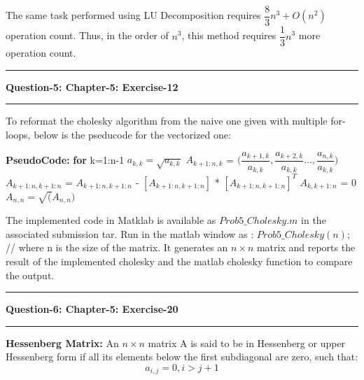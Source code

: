 \documentclass{article}
\newcommand\question[2]{\vspace{.25in}\hrule\textbf{#1: #2}\hrule\vspace{.10in}}
\newcommand\pseudoCode{\vspace{.10in}\textbf{PseudoCode: }}
\begin{document}
The same task performed using LU Decomposition requires $\dfrac{8}{3}n^3 + O(n^2)$ operation count. Thus, in the order of $n^3$, this method requires $\dfrac{1}{3}n^3$ more operation count. 


\question{Question-5}{Chapter-5: Exercise-12}
 To reformat the cholesky algorithm from the naive one given with multiple for-loops, below is the pseducode for the vectorized one: \newline

\pseudoCode \newline
\hspace*{0.5cm} \textbf {for} k=1:n-1 \newline
\hspace*{1cm}                       $a_{k,k} = \sqrt{a_{k,k}}$ \newline
\hspace*{1cm}                      $A_{k+1:n, k}$ = $\bigg (  \dfrac{a_{k+1,k}}{a_{k,k}} , \dfrac{a_{k+2,k}}{a_{k,k}} \dots ,\dfrac{a_{n,k}}{a_{k,k}}\bigg )$ \newline
\hspace*{1cm}                      $A_{k+1:n,k+1:n}$ = $A_{k+1:n,k+1:n}$ - $[A_{k+1:n,k+1:n}]$ * $[A_{k+1:n,k+1:n}]^T$ \newline
\hspace*{1cm}                     $A_{k,k+1:n}$ = 0 \newline
\hspace*{0.5cm}   $A_{n,n} = \sqrt(A_{n,n})$ \newline

The implemented code in Matklab is available as $Prob5\_Cholesky.m$  in the associated submission tar. Run in the matlab window as :\newline
$Prob5\_Cholesky(n)$;  // where n is the size of the matrix. It generates an $n \times n$ matrix and reports the result of the implemented cholesky and the matlab cholesky function to compare the output. \newline


\question{Question-6}{Chapter-5: Exercise-20}
\textbf {Hessenberg Matrix:} An $n \times n$ matrix A is said to be in Hessenberg or upper Hessenberg form if all its elements below the first subdiagonal are zero, such that:\newline
\[ a_{i,j} = 0, i>j+1\]
\end{document}
